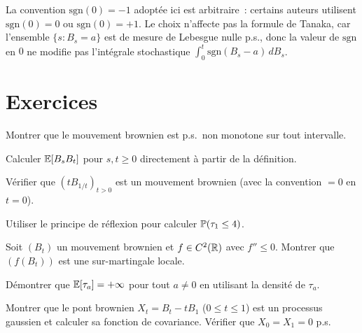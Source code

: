 \begin{remarque}
La convention $\text{sgn}(0) = -1$ adopt\'ee ici est arbitraire~: certains
auteurs utilisent $\text{sgn}(0) = 0$ ou $\text{sgn}(0) = +1$. Le choix
n'affecte pas la formule de Tanaka, car l'ensemble $\{s : B_s = a\}$ est
de mesure de Lebesgue nulle p.s., donc la valeur de $\text{sgn}$ en $0$
ne modifie pas l'int\'egrale stochastique $\int_0^t \text{sgn}(B_s - a)\, dB_s$.
\end{remarque}

\section{Exercices}

\begin{exercice}
Montrer que le mouvement brownien est p.s.\ non monotone sur tout intervalle.
\end{exercice}

\begin{exercice}
Calculer $\mathbb{E}[B_s B_t]$ pour $s, t \geq 0$ directement \`a partir de la
d\'efinition.
\end{exercice}

\begin{exercice}
V\'erifier que $(t B_{1/t})_{t > 0}$ est un mouvement brownien (avec la
convention $= 0$ en $t = 0$).
\end{exercice}

\begin{exercice}
Utiliser le principe de r\'eflexion pour calculer $\mathbb{P}(\tau_1 \leq 4)$.
\end{exercice}

\begin{exercice}
Soit $(B_t)$ un mouvement brownien et $f \in C^2(\mathbb{R})$ avec $f'' \leq 0$.
Montrer que $(f(B_t))$ est une sur-martingale locale.
\end{exercice}

\begin{exercice}
D\'emontrer que $\mathbb{E}[\tau_a] = +\infty$ pour tout $a \neq 0$ en utilisant la
densit\'e de $\tau_a$.
\end{exercice}

\begin{exercice}
Montrer que le pont brownien $X_t = B_t - tB_1$ ($0 \leq t \leq 1$) est un
processus gaussien et calculer sa fonction de covariance. V\'erifier que
$X_0 = X_1 = 0$ p.s.
\end{exercice}
